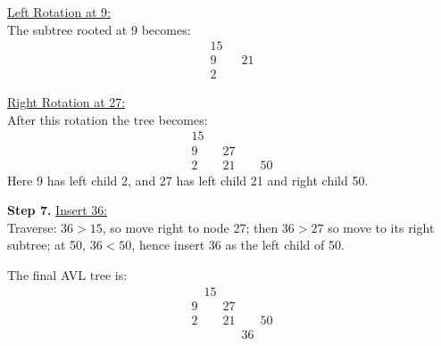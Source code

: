 \documentclass[11pt]{article}
\begin{document}
\underline{Left Rotation at 9:}\\[2mm]
The subtree rooted at 9 becomes:
\[
    \begin{array}{c}
        15              \\[2mm]
        9 \quad\quad 21 \\[2mm]
        2
    \end{array}
\]


\underline{Right Rotation at 27:}\\[2mm]
After this rotation the tree becomes:
\[
    \begin{array}{c}
        15              \\[4mm]
        9 \quad\quad 27 \\[4mm]
        2 \quad\quad 21 \quad\quad 50
    \end{array}
\]
Here 9 has left child 2, and 27 has left child 21 and right child 50.


\begin{center}
\end{center}

\textbf{Step 7.} \underline{Insert 36:}\\[2mm]
Traverse: $36>15$, so move right to node 27; then $36>27$ so move to its right subtree; at 50, $36<50$, hence insert 36 as the left child of 50.


The final AVL tree is:
\[
    \begin{array}{c}
        \quad15                      \\[4mm]
        9 \quad\quad 27              \\[4mm]
        2\quad\quad 21 \quad\quad 50 \\[2mm]
        \qquad\quad\quad 36
    \end{array}
\]


\begin{center}
\end{center}
\end{document}

